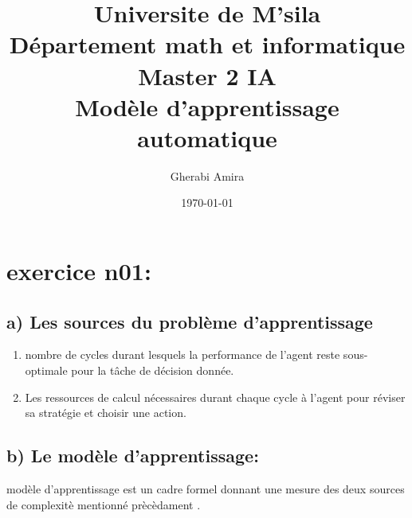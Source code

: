 \documentclass[11pt, a4paper]{article}
\title{Universite de M'sila \\ Département math et informatique 
\\ Master 2 IA \\Modèle d'apprentissage automatique}
\author{Gherabi Amira}
\date{\today}
\begin{document}
\maketitle

\section*{exercice n01:}
    \subsection*{a) Les sources du problème d’apprentissage}
    \begin{enumerate}
        \item nombre de cycles durant lesquels la performance 
        de l’agent reste sous-optimale pour la tâche de décision donnée.
        \item Les ressources de calcul nécessaires durant chaque 
        cycle à l’agent pour réviser sa stratégie et choisir une action.



    \end{enumerate}
    \subsection*{b)   Le modèle d’apprentissage:}
    modèle d’apprentissage est un cadre formel donnant une mesure des deux
    sources de complexitè mentionné prècèdament .
\end{document}
